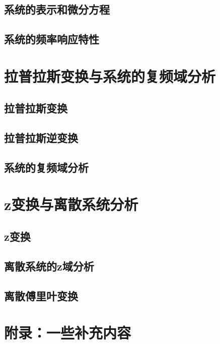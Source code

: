 \documentclass{ctexbook}
\begin{document}
\section{系统的表示和微分方程}\label{sec:Presentation_ODE}


\section{系统的频率响应特性}\label{sec:freq_response}

\chapter{拉普拉斯变换与系统的复频域分析}

\section{拉普拉斯变换}\label{sec:Laplace_Transform}

\section{拉普拉斯逆变换}\label{sec:Laplace_Inverse}

\section{系统的复频域分析}\label{sec:Complex_Freq_Analysis}

\chapter{z变换与离散系统分析}

\section{z变换}\label{sec:z_Transform}

\section{离散系统的z域分析}\label{sec:Discrete_System_z_Analysis}

\section{离散傅里叶变换}\label{sec:DFT}

\chapter{附录：一些补充内容}%
\end{document}
